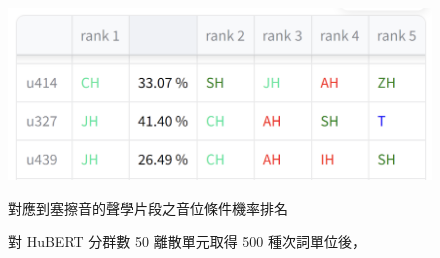 
    \begin{figure}
        \centering
        \includegraphics[width=0.8\linewidth]{figures/ch4figs/aff-hub50-500.png}
        \caption{對 HuBERT 分群數 50 離散單元取得 500 種次詞單位後，}
        對應到塞擦音的聲學片段之音位條件機率排名
        \label{fig:aff}
    \end{figure}


